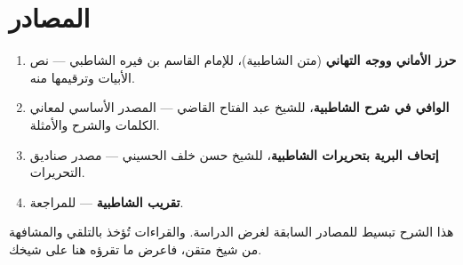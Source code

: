 \chapter{المصادر}
\begin{enumerate}
\item \textbf{حرز الأماني ووجه التهاني} (متن الشاطبية)، للإمام القاسم بن فيره الشاطبي — نص الأبيات وترقيمها منه.
\item \textbf{الوافي في شرح الشاطبية}، للشيخ عبد الفتاح القاضي — المصدر الأساسي لمعاني الكلمات والشرح والأمثلة.
\item \textbf{إتحاف البرية بتحريرات الشاطبية}، للشيخ حسن خلف الحسيني — مصدر صناديق التحريرات.
\item \textbf{تقريب الشاطبية} — للمراجعة.
\end{enumerate}

\begin{tanbih}
هذا الشرح تبسيط للمصادر السابقة لغرض الدراسة. والقراءات تُؤخذ بالتلقي والمشافهة من شيخ متقن، فاعرض ما تقرؤه هنا على شيخك.
\end{tanbih}
